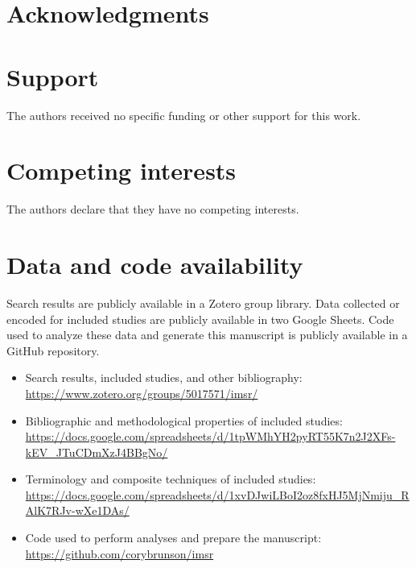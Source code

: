 \documentclass[preprint, 3p,
authoryear]{elsarticle} %
\providecommand{\tightlist}{%
  \setlength{\itemsep}{0pt}\setlength{\parskip}{0pt}}
\begin{document}
\hypertarget{acknowledgments}{%
\section{Acknowledgments}\label{acknowledgments}}

\hypertarget{support}{%
\section{Support}\label{support}}

The authors received no specific funding or other support for this work.

\hypertarget{competing-interests}{%
\section{Competing interests}\label{competing-interests}}

The authors declare that they have no competing interests.

\hypertarget{data-and-code-availability}{%
\section{Data and code availability}\label{data-and-code-availability}}

\label{sec:availability}

Search results are publicly available in a Zotero group library. Data
collected or encoded for included studies are publicly available in two
Google Sheets. Code used to analyze these data and generate this
manuscript is publicly available in a GitHub repository.

\begin{itemize}
\tightlist
\item
  Search results, included studies, and other bibliography:
  \url{https://www.zotero.org/groups/5017571/imsr/}
\item
  Bibliographic and methodological properties of included studies:
  \url{https://docs.google.com/spreadsheets/d/1tpWMhYH2pyRT55K7n2J2XFs-kEV_JTuCDmXzJ4BBgNo/}
\item
  Terminology and composite techniques of included studies:
  \url{https://docs.google.com/spreadsheets/d/1xvDJwiLBoI2oz8fxHJ5MjNmiju_RAlK7RJv-wXe1DAs/}
\item
  Code used to perform analyses and prepare the manuscript:
  \url{https://github.com/corybrunson/imsr}
\end{itemize}
\end{document}
